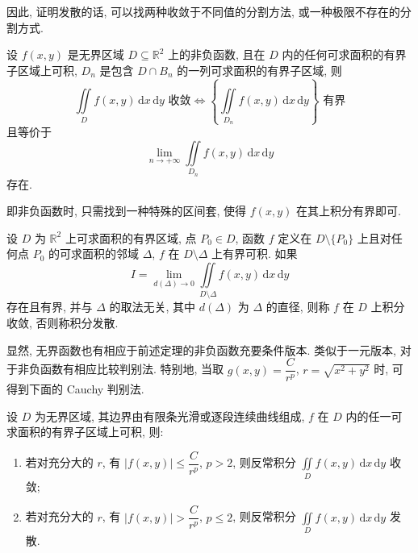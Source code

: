 \documentclass[../../数学分析培优讲义.tex]{subfiles}
\begin{document}
\begin{remark}
因此, 证明发散的话, 可以找两种收敛于不同值的分割方法, 或一种极限不存在的分割方式.
\end{remark}

\begin{theorem}[\markstar]
设 $f(x,y)$ 是无界区域 $D\subseteq\mathbb{R}^2$ 上的非负函数, 且在 $D$ 内的任何可求面积的有界子区域上可积, $D_n$ 是包含 $D\cap B_n$ 的一列可求面积的有界子区域, 则
\[
    \iint\limits_D f(x,y)\,\mathrm{d}x\,\mathrm{d}y\text{ 收敛}
    \iff
    \left\{\iint\limits_{D_n}f(x,y)\,\mathrm{d}x\,\mathrm{d}y\right\}\text{ 有界}
\]
且等价于
\[
    \lim\limits_{n\to+\infty}\iint\limits_{D_n}f(x,y)\,\mathrm{d}x\,\mathrm{d}y
\]
存在.
\end{theorem}

\begin{remark}
即非负函数时, 只需找到一种特殊的区间套, 使得 $f(x,y)$ 在其上积分有界即可.
\end{remark}

\begin{definition}[无界函数]
设 $D$ 为 $\mathbb{R}^2$ 上可求面积的有界区域, 点 $P_0\in D$, 函数 $f$ 定义在 $D\setminus\{P_0\}$ 上且对任何点 $P_0$ 的可求面积的邻域 $\Delta$, $f$ 在 $D\setminus\Delta$ 上有界可积. 如果
\[
    I=\lim\limits_{d(\Delta)\to0}\iint\limits_{D\setminus\Delta}f(x,y)\,\mathrm{d}x\,\mathrm{d}y
\]
存在且有界, 并与 $\Delta$ 的取法无关, 其中 $d(\Delta)$ 为 $\Delta$ 的直径, 则称 $f$ 在 $D$ 上积分收敛, 否则称积分发散.
\end{definition}

\begin{remark}
显然, 无界函数也有相应于前述定理的非负函数充要条件版本. 类似于一元版本, 对于非负函数有相应比较判别法. 特别地, 当取 $g(x,y)=\dfrac{C}{r^p}$, $r=\sqrt{x^2+y^2}$ 时, 可得到下面的 Cauchy 判别法.
\end{remark}

\begin{theorem}
设 $D$ 为无界区域, 其边界由有限条光滑或逐段连续曲线组成, $f$ 在 $D$ 内的任一可求面积的有界子区域上可积, 则:
\begin{enumerate}[label=(\arabic*)]
    \item 若对充分大的 $r$, 有 $|f(x,y)|\leq\dfrac{C}{r^p}$, $p>2$, 则反常积分 $\displaystyle\iint\limits_Df(x,y)\,\mathrm{d}x\,\mathrm{d}y$ 收敛;
    \item 若对充分大的 $r$, 有 $|f(x,y)|>\dfrac{C}{r^p}$, $p\leq2$, 则反常积分 $\displaystyle\iint\limits_Df(x,y)\,\mathrm{d}x\,\mathrm{d}y$ 发散.
\end{enumerate}
\end{theorem}
\end{document}

